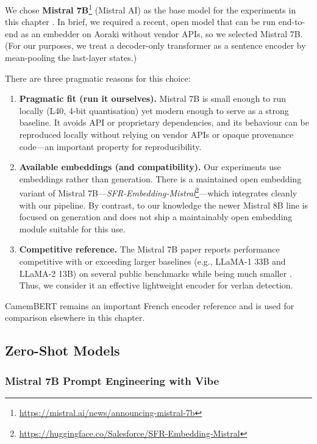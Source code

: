 \documentclass[12pt]{article}
\begin{document}
We chose \textbf{Mistral 7B}\footnote{\url{https://mistral.ai/news/announcing-mistral-7b}} (Mistral AI) as the base model for the experiments in this chapter \cite{jiang2023mistral7b}. In brief, we required a recent, open model that can be run end-to-end as an embedder on Aoraki without vendor APIs, so we selected Mistral 7B. (For our purposes, we treat a decoder-only transformer as a sentence encoder by mean-pooling the last-layer states.)

There are three pragmatic reasons for this choice:
\begin{enumerate}
\item \textbf{Pragmatic fit (run it ourselves).} Mistral 7B is small enough to run locally (L40, 4-bit quantisation) yet modern enough to serve as a strong baseline. It avoids API or proprietary dependencies, and its behaviour can be reproduced locally without relying on vendor APIs or opaque provenance code\;---\;an important property for reproducibility.
\item \textbf{Available embeddings (and compatibility).} Our experiments use embeddings rather than generation. There is a maintained open embedding variant of Mistral 7B—\emph{SFR-Embedding-Mistral}\footnote{\url{https://huggingface.co/Salesforce/SFR-Embedding-Mistral}}\;---\;which integrates cleanly with our pipeline. By contrast, to our knowledge the newer Mistral 8B line is focused on generation and does not ship a maintainably open embedding module suitable for this use.
\item \textbf{Competitive reference.} The Mistral 7B paper reports performance competitive with or exceeding larger baselines (e.g., LLaMA-1 33B and LLaMA-2 13B) on several public benchmarks while being much smaller \cite{jiang2023mistral7b,touvron2023llama,touvron2023llama2}. Thus, we consider it an effective lightweight encoder for verlan detection.
\end{enumerate}

CamemBERT \cite{martin2019camembert} remains an important French encoder reference and is used for comparison elsewhere in this chapter.


\subsection{Zero-Shot Models}
\subsubsection{Mistral 7B Prompt Engineering with Vibe}
\end{document}

